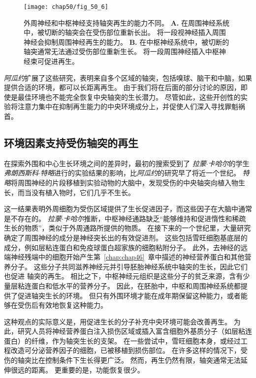 \begin{figure}[htbp]
	\centering
	\texttt{[image: chap50/fig\_50\_6]}
	\caption{外周神经和中枢神经支持轴突再生的能力不同。
		\textbf{A.} 在周围神经系统中，被切断的轴突会在受伤部位重新长出。
		将一段视神经插入周围神经会抑制周围神经再生的能力。
		\textbf{B.} 在中枢神经系统中，被切断的轴突通常无法通过受伤部位重新生长。
		将一段周围神经插入中枢神经束可促进再生。}
	\label{fig:50_6}
\end{figure}


\textit{阿瓜约}扩展了这些研究，表明来自多个区域的轴突，包括嗅球、脑干和中脑，如果提供合适的环境，都可以长距离再生。
由于我们将在后面的部分讨论的原因，即使是最佳环境也不能完全恢复中央轴突的生长潜力。
尽管如此，这些开创性的实验将注意力集中在抑制再生能力的中央环境成分上，并促使人们深入寻找罪魁祸首。



\subsection{环境因素支持受伤轴突的再生}

在探索外围和中心生长环境之间的差异时，最初的搜索受到了 \textit{拉蒙$\cdot$卡哈尔}的学生\textit{弗朗西斯科$\cdot$特略}进行的实验结果的影响，比\textit{阿瓜约}的研究早了将近一个世纪。
\textit{特略}将周围神经的片段移植到实验动物的大脑中，发现受伤的中央轴突向植入物生长，而当没有植入物时，它们几乎不生长。


这一结果表明外周细胞为受伤区域提供了生长促进因子，而这些因子在大脑中通常是不存在的。
\textit{拉蒙$\cdot$卡哈尔}推断，中枢神经通路缺乏“能够维持和促进惰性和稀疏生长的物质”，类似于外周通路所提供的物质。
在接下来的一个世纪里，大量研究确定了周围神经的成分是神经突长出的有效促进剂。
这些包括雪旺细胞基底层的成分，例如层粘连蛋白和免疫球蛋白超家族的细胞粘附分子。
此外，去神经的远端神经残端中的细胞开始产生第~\ref{chap:chap46}~章中描述的神经营养蛋白和其他营养分子。
这些分子共同滋养神经元并引导胚胎神经系统中轴突的生长，因此它们也促进 轴突的再生。
相比之下，中枢神经元组织是这些分子的贫乏来源，含有少量层粘连蛋白和低水平的营养分子。
因此，在胚胎中，中枢和周围神经系统都提供了促进轴突生长的环境。
但只有外围环境才能在成年期保留这种能力，或者能够在受伤后有效地恢复这种能力。


这种观点的实际意义是，用促进生长的分子补充中央环境可能会改善再生。
为此，研究人员将神经营养蛋白注入损伤区域或插入富含细胞外基质分子（如层粘连蛋白）的纤维，作为轴突生长的支架。
在一些尝试中，雪旺细胞本身，或经过工程改造可分泌营养因子的细胞，已被移植到损伤部位。
在许多这样的情况下，受伤的轴突比在控制条件下生长得更广泛。
然而，再生仍然有限，轴突通常无法延伸很远的距离。
更重要的是，功能恢复很少。



